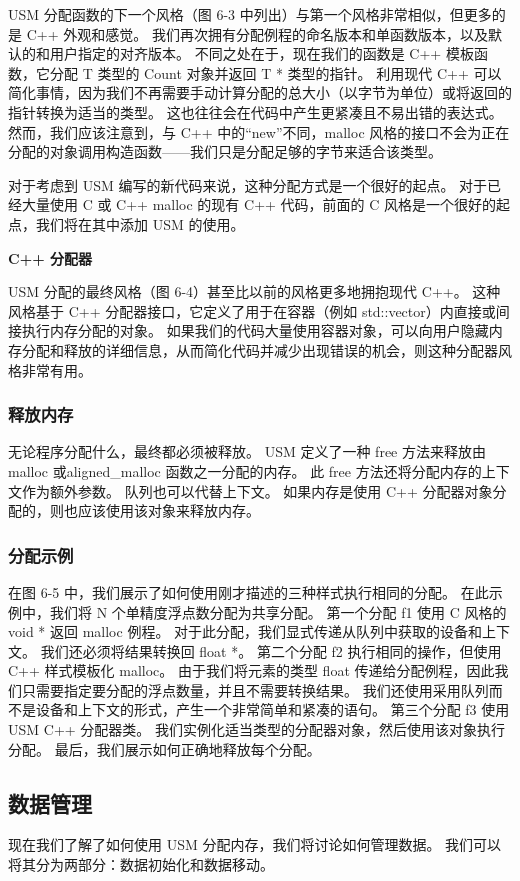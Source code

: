 USM 分配函数的下一个风格（图 6-3 中列出）与第一个风格非常相似，但更多的是 C++ 外观和感觉。 我们再次拥有分配例程的命名版本和单函数版本，以及默认的和用户指定的对齐版本。 不同之处在于，现在我们的函数是 C++ 模板函数，它分配 T 类型的 Count 对象并返回 T * 类型的指针。 利用现代 C++ 可以简化事情，因为我们不再需要手动计算分配的总大小（以字节为单位）或将返回的指针转换为适当的类型。 这也往往会在代码中产生更紧凑且不易出错的表达式。 然而，我们应该注意到，与 C++ 中的“new”不同，malloc 风格的接口不会为正在分配的对象调用构造函数——我们只是分配足够的字节来适合该类型。

对于考虑到 USM 编写的新代码来说，这种分配方式是一个很好的起点。 对于已经大量使用 C 或 C++ malloc 的现有 C++ 代码，前面的 C 风格是一个很好的起点，我们将在其中添加 USM 的使用。

\textbf{C++ 分配器}

USM 分配的最终风格（图 6-4）甚至比以前的风格更多地拥抱现代 C++。 这种风格基于 C++ 分配器接口，它定义了用于在容器（例如 std::vector）内直接或间接执行内存分配的对象。 如果我们的代码大量使用容器对象，可以向用户隐藏内存分配和释放的详细信息，从而简化代码并减少出现错误的机会，则这种分配器风格非常有用。

\subsubsection{释放内存}
无论程序分配什么，最终都必须被释放。 USM 定义了一种 free 方法来释放由 malloc 或aligned\_malloc 函数之一分配的内存。 此 free 方法还将分配内存的上下文作为额外参数。 队列也可以代替上下文。 如果内存是使用 C++ 分配器对象分配的，则也应该使用该对象来释放内存。

\subsubsection{分配示例}
在图 6-5 中，我们展示了如何使用刚才描述的三种样式执行相同的分配。 在此示例中，我们将 N 个单精度浮点数分配为共享分配。 第一个分配 f1 使用 C 风格的 void * 返回 malloc 例程。 对于此分配，我们显式传递从队列中获取的设备和上下文。 我们还必须将结果转换回 float *。 第二个分配 f2 执行相同的操作，但使用 C++ 样式模板化 malloc。 由于我们将元素的类型 float 传递给分配例程，因此我们只需要指定要分配的浮点数量，并且不需要转换结果。 我们还使用采用队列而不是设备和上下文的形式，产生一个非常简单和紧凑的语句。 第三个分配 f3 使用 USM C++ 分配器类。 我们实例化适当类型的分配器对象，然后使用该对象执行分配。 最后，我们展示如何正确地释放每个分配。

\subsection{数据管理}
现在我们了解了如何使用 USM 分配内存，我们将讨论如何管理数据。 我们可以将其分为两部分：数据初始化和数据移动。

